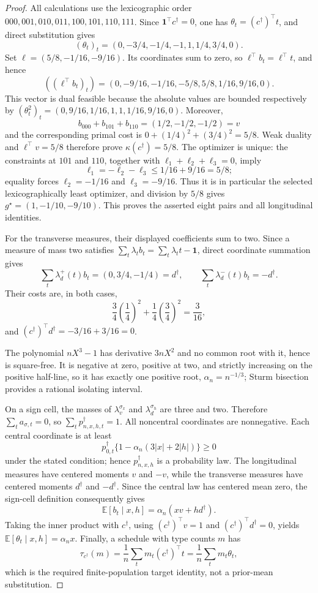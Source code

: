 \documentclass{article}
\begin{document}
\begin{proof}
All calculations use the lexicographic order
\(000,001,010,011,100,101,110,111\).  Since \(\mathbf1^\top c^\dagger=0\), one has \(\theta_t=(c^\dagger)^\top t\), and direct substitution gives
\[
(\theta_t)_t=(0,-3/4,-1/4,-1,1,1/4,3/4,0).
\]
Set \(\ell=(5/8,-1/16,-9/16)\).  Its coordinates sum to zero, so \(\ell^\top b_t=\ell^\top t\), and hence
\[
((\ell^\top b_t)_t)=(0,-9/16,-1/16,-5/8,5/8,1/16,9/16,0).
\]
This vector is dual feasible because the absolute values are bounded respectively by
\((\theta_t^2)_t=(0,9/16,1/16,1,1,1/16,9/16,0)\).  Moreover,
\[
b_{000}+b_{101}+b_{110}=(1/2,-1/2,-1/2)=v
\]
and the corresponding primal cost is \(0+(1/4)^2+(3/4)^2=5/8\).  Weak duality and
\(\ell^\top v=5/8\) therefore prove \(\kappa(c^\dagger)=5/8\).  The optimizer is unique: the constraints at \(101\) and \(110\), together with \(\ell_1+\ell_2+\ell_3=0\), imply
\[
\ell_1=-\ell_2-\ell_3\le1/16+9/16=5/8;
\]
equality forces \(\ell_2=-1/16\) and \(\ell_3=-9/16\).  Thus it is in particular the selected lexicographically least optimizer, and division by \(5/8\) gives
\(g^\star=(1,-1/10,-9/10)\).  This proves the asserted eight pairs and all longitudinal identities.

For the transverse measures, their displayed coefficients sum to two.  Since a measure of mass two satisfies \(\sum_t\lambda_tb_t=\sum_t\lambda_tt-\mathbf1\), direct coordinate summation gives
\[
\sum_t\lambda_d^+(t)b_t=(0,3/4,-1/4)=d^\dagger,\qquad
\sum_t\lambda_d^-(t)b_t=-d^\dagger.
\]
Their costs are, in both cases,
\[
\frac34\left(\frac14\right)^2+\frac14\left(\frac34\right)^2
=\frac3{16},
\]
and \((c^\dagger)^\top d^\dagger=-3/16+3/16=0\).

The polynomial \(nX^3-1\) has derivative \(3nX^2\) and no common root with it, hence is square-free.  It is negative at zero, positive at two, and strictly increasing on the positive half-line, so it has exactly one positive root, \(\alpha_n=n^{-1/3}\); Sturm bisection provides a rational isolating interval.

On a sign cell, the masses of \(\lambda_v^{\sigma_x}\) and \(\lambda_d^{\sigma_h}\) are three and two.  Therefore \(\sum_ta_{\sigma,t}=0\), so \(\sum_tp_{n,x,h,t}^\dagger=1\).  All noncentral coordinates are nonnegative.  Each central coordinate is at least
\[
p_{0,t}^\dagger\{1-\alpha_n(3|x|+2|h|)\}\ge0
\]
under the stated condition; hence \(p_{n,x,h}^\dagger\) is a probability law.  The longitudinal measures have centered moments \(v\) and \(-v\), while the transverse measures have centered moments \(d^\dagger\) and \(-d^\dagger\).  Since the central law has centered mean zero, the sign-cell definition consequently gives
\[
\mathbb E[b_t\mid x,h]=\alpha_n(xv+hd^\dagger).
\]
Taking the inner product with \(c^\dagger\), using \((c^\dagger)^\top v=1\) and \((c^\dagger)^\top d^\dagger=0\), yields
\(\mathbb E[\theta_t\mid x,h]=\alpha_nx\).  Finally, a schedule with type counts \(m\) has
\[
\tau_{c^\dagger}(m)=\frac1n\sum_tm_t(c^\dagger)^\top t
=\frac1n\sum_tm_t\theta_t,
\]
which is the required finite-population target identity, not a prior-mean substitution.


\end{proof}
\end{document}
